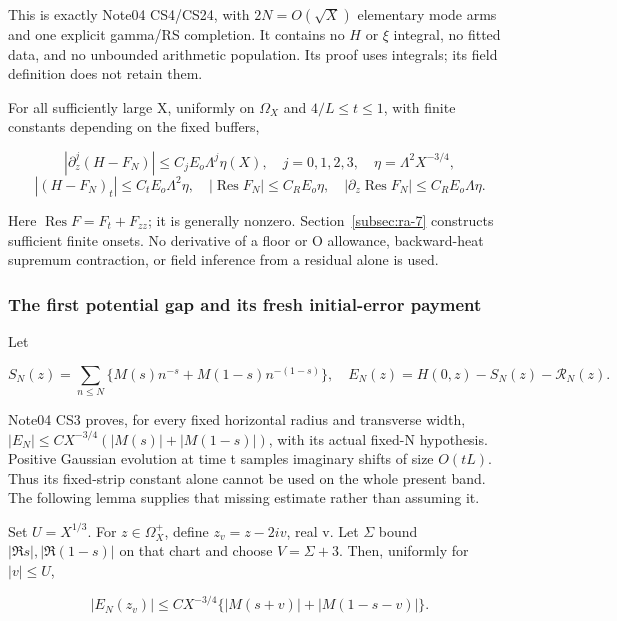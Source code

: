 This is exactly Note04 CS4/CS24, with \(2N=O(\sqrt X)\) elementary mode arms and one explicit gamma/RS completion. It contains no $H$ or $\xi$ integral, no fitted data, and no unbounded arithmetic population. Its proof uses integrals; its field definition does not retain them.

\begin{theorem}\label{thm:retained-positive-band}
 For all sufficiently large X, uniformly on \(\Omega_{X}\) and \(4/L\le t\le 1\), with finite constants depending on the fixed buffers,

\[
\boxed{|\partial_z^j(H-F_N)|\le C_jE_o\Lambda^j\eta(X),
\quad j=0,1,2,3,\quad\eta=\Lambda^2X^{-3/4},}
\]
\[
\boxed{|(H-F_N)_t|\le C_tE_o\Lambda^2\eta,\quad
|\operatorname{Res}F_N|\le C_RE_o\eta,\quad
|\partial_z\operatorname{Res}F_N|\le C_RE_o\Lambda\eta.}
\tag{RA5}\label{eq:ansatz-ra5}
\]
\end{theorem}

Here \(\operatorname{Res} F=F_{t}+F_{zz}\); it is generally nonzero. Section~\ref{subsec:ra-7} constructs sufficient finite onsets. No derivative of a floor or O allowance, backward-heat supremum contraction, or field inference from a residual alone is used.

\subsubsection{The first potential gap and its fresh initial-error payment}
\label{subsec:ra-2}

Let

\[
S_N(z)=\sum_{n\le N}\{M(s)n^{-s}+M(1-s)n^{-(1-s)}\},\quad
E_N(z)=H(0,z)-S_N(z)-\mathcal R_N(z).
\tag{RA6}\label{eq:ansatz-ra6}
\]

Note04 CS3 proves, for every fixed horizontal radius and transverse width, \(|E_{N}|\le C X^{-3/4}(|M(s)|+|M(1-s)|)\), with its actual fixed-N hypothesis. Positive Gaussian evolution at time t samples imaginary shifts of size \(O(tL).\) Thus its fixed-strip constant alone cannot be used on the whole present band. The following lemma supplies that missing estimate rather than assuming it.

Set \(U=X^{1/3}\). For \(z\in \Omega_X^+\), define \(z_{v}=z-2iv\), real v. Let \(\Sigma\) bound \(|\Re s|,|\Re(1-s)|\) on that chart and choose \(V=\Sigma+3\). Then, uniformly for \(|v|\le U\),

\[
|E_N(z_v)|\le C X^{-3/4}
       \{|M(s+v)|+|M(1-s-v)|\}.
\tag{RA7}\label{eq:ansatz-ra7}
\]

